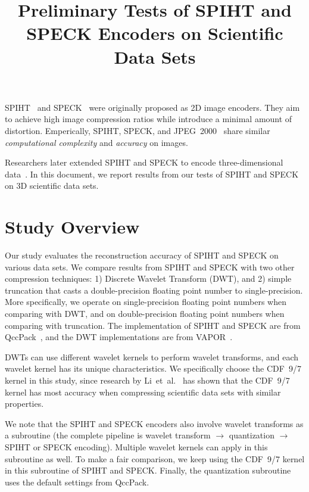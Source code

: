 \documentclass[review]{vgtc}                 %
\title{Preliminary Tests of SPIHT and SPECK Encoders on Scientific Data Sets}
\begin{document}

\maketitle

\label{sec:intro}
%
SPIHT~\cite{said1996new} and SPECK~\cite{pearlman2004efficient} 
were originally proposed as 2D image encoders.
%
They aim to achieve high image compression ratios while introduce 
a minimal amount of distortion.
%
Emperically, SPIHT, SPECK, and JPEG~2000~\cite{pearlman2004efficient}
share similar \textit{computational complexity} and \textit{accuracy}
on images.


Researchers later extended SPIHT and SPECK to encode three-dimensional
data~\cite{kim1997embedded, tang2006three}. 
%
In this document, we report results from our tests of 
SPIHT and SPECK on 3D scientific data sets.


\section{Study Overview}
%
Our study evaluates the reconstruction accuracy of SPIHT and SPECK
on various data sets. 
%
We compare results from SPIHT and SPECK with two other compression techniques:
1) Discrete Wavelet Transform (DWT), 
and 2) simple truncation that casts a double-precision
floating point number to single-precision.
%
More specifically, 
we operate on single-precision floating point numbers
when comparing with DWT, and on double-precision 
floating point numbers when comparing with truncation.
%
The implementation of SPIHT and SPECK are from QccPack~\cite{fowler2000qccpack},
and the DWT implementations are from VAPOR~\cite{clyne2007interactive}.


DWTs can use different wavelet kernels to perform wavelet transforms,
and each wavelet kernel has its unique characteristics.
%
We specifically choose the CDF~9/7 kernel in this study, since research by
Li~et~al.~\cite{li2015evaluating}
has shown that the CDF~9/7 kernel has most accuracy when compressing 
scientific data sets with similar properties.
%


We note that the SPIHT and SPECK encoders also involve wavelet transforms
as a subroutine (the complete pipeline is wavelet transform 
$\rightarrow$ quantization $\rightarrow$ SPIHT or SPECK encoding).
%
Multiple wavelet kernels can apply in this subroutine as well.
%
To make a fair comparison, we keep using the CDF~9/7 kernel in 
this subroutine of SPIHT and SPECK.
%
Finally, the quantization subroutine uses the default settings
from QccPack.
\end{document}
